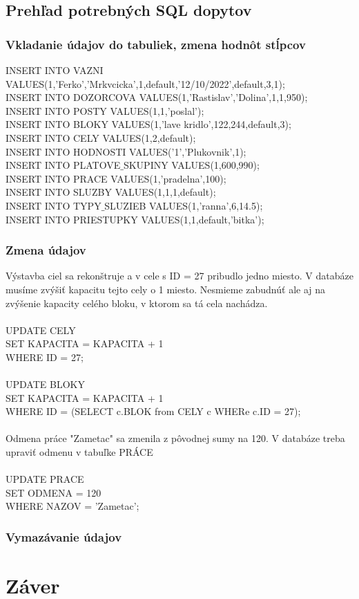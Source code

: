 \documentclass[slovak, 12pt, Times New Roman]{article}
\begin{document}
		\subsection{Prehľad potrebných SQL dopytov}
			\subsubsection{Vkladanie údajov do tabuliek, zmena hodnôt stĺpcov}
				INSERT INTO VAZNI VALUES(1,'Ferko','Mrkvcicka',1,default,'12/10/2022',default,3,1);\\
				INSERT INTO DOZORCOVA VALUES(1,'Rastislav','Dolina',1,1,950);\\
				INSERT INTO POSTY VALUES(1,1,'poslal');\\
				INSERT INTO BLOKY VALUES(1,'lave kridlo',122,244,default,3);\\
				INSERT INTO CELY VALUES(1,2,default);\\
				INSERT INTO HODNOSTI VALUES('1','Plukovnik',1);\\
				INSERT INTO PLATOVE$\_$SKUPINY VALUES(1,600,990);\\
				INSERT INTO PRACE VALUES(1,'pradelna',100);\\
				INSERT INTO SLUZBY VALUES(1,1,1,default);\\
				INSERT INTO TYPY$\_$SLUZIEB VALUES(1,'ranna',6,14.5);\\
				INSERT INTO PRIESTUPKY VALUES(1,1,default,'bitka');\\
			\subsubsection{Zmena údajov}
				Výstavba ciel sa rekonštruje a v cele s ID = 27 pribudlo jedno miesto. V databáze musíme zvýšiť kapacitu tejto cely o 1 miesto. Nesmieme zabudnúť ale aj na zvýšenie kapacity celého bloku, v ktorom sa tá cela nachádza.\\
				\\
				UPDATE CELY\\
				SET KAPACITA = KAPACITA + 1\\
				WHERE ID = 27;\\
				\\
				UPDATE BLOKY\\
				SET KAPACITA = KAPACITA + 1\\
				WHERE ID = (SELECT c.BLOK from CELY c WHERe c.ID = 27);\\
				\\
				Odmena práce "Zametac" sa zmenila z pôvodnej sumy na 120. V databáze treba upraviť odmenu v tabuľke PRÁCE\\
				\\
				UPDATE PRACE\\
				SET ODMENA = 120\\
				WHERE NAZOV = 'Zametac';\\

			\subsubsection{Vymazávanie údajov}

	\section{Záver}
\end{document}
